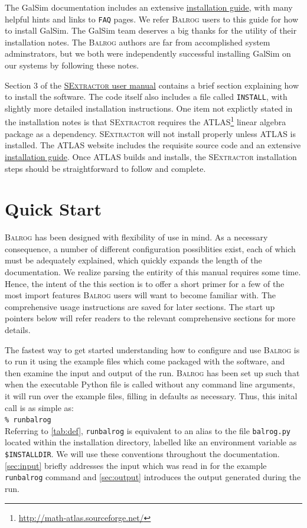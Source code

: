 \documentclass[12pt]{book}
\newcommand{\py}{Python}
\newcommand{\galsim}{GalSim}
\newcommand{\balrog}{\textsc{Balrog}}
\newcommand{\sex}{\textsc{SExtractor}}
\newcommand{\inline}{\\[0.4cm]}
\newcommand{\bcmd}[1]{\texttt{\% runbalrog #1}}
\begin{document}
The \galsim{} documentation includes an extensive
\href{https://github.com/GalSim-developers/GalSim/blob/releases/1.0/INSTALL.md}{installation guide},
with many helpful hints and links to \texttt{FAQ} pages. 
We refer \balrog{} users to this guide for how to install \galsim{}.
The \galsim{} team deserves a big thanks for the utility of their installation notes.
The \balrog{} authors are far from accomplished system adminstrators, 
but we both were independently successful installing \galsim{} on our systems by following these notes.

Section 3 of the \href{https://www.astromatic.net/pubsvn/software/sextractor/trunk/doc/sextractor.pdf}{\sex{} user manual}
contains a brief section explaining how to install the software. The code itself also includes a file called \texttt{INSTALL}, with
slightly more detailed installation instructions.
One item not explictly stated in the installation notes is that \sex{} requires the ATLAS\footnote{\url{http://math-atlas.sourceforge.net/}}
linear algebra package as a dependency.
\sex{} will not install properly unless ATLAS is installed. 
The ATLAS website includes the requisite source code and
an extensive \href{http://math-atlas.sourceforge.net/atlas_install/}{installation guide}.
Once ATLAS builds and installs, the \sex{} installation steps should be straightforward to follow and complete.


\chapter{Quick Start}
\label{sec:quick}

\balrog{} has been designed with flexibility of use in mind. As a necessary consequence, 
a number of different configuration possiblities exist, each of which must be
adequately explained, which quickly expands the length of the documentation.
We realize parsing the entirity of this manual requires some time.
Hence, the intent of the this section is to offer a short primer for a few of the most import features
\balrog{} users will want to become familiar with.
The comprehensive usage instructions are saved for later sections.
The start up pointers below will refer readers to the relevant comprehensive sections for more details.

The fastest way to get started understanding how to configure and use \balrog{} is to
run it using the example files which come packaged with the software, and then examine the input
and output of the run. 
\balrog{} has been set up such that when the executable \py{}
file is called without any command line arguments, it will run over
the example files, filling in defaults as necessary. 
Thus, this inital call is as simple as:
\inline
\bcmd{}
\inline
Referring to \autoref{tab:def}, \texttt{runbalrog} is equivalent to an alias to the file
\texttt{balrog.py} located within the installation directory, labelled like an environment variable as \texttt{\$INSTALLDIR}. We will use these conventions
throughout the documentation. \autoref{sec:input} briefly addresses
the input which was read in for the example \texttt{runbalrog} command and \autoref{sec:output} introduces the output
generated during the run.
\end{document}
